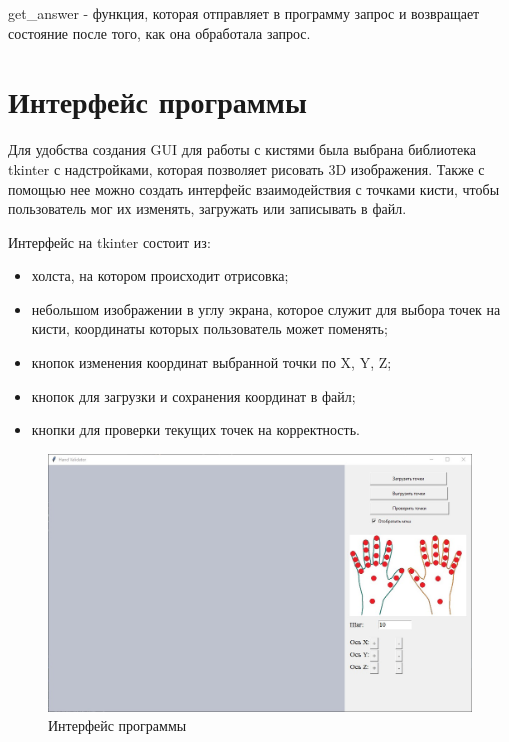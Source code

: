 \hspace{0.6cm} get\_answer - функция, которая отправляет в программу запрос и возвращает состояние после того, как она обработала запрос.

\section{Интерфейс программы}
\hspace{0.6cm} Для удобства создания GUI для работы с кистями была выбрана библиотека tkinter с надстройками, которая позволяет рисовать 3D изображения. Также с помощью нее можно создать интерфейс взаимодействия с точками кисти, чтобы пользователь мог их изменять, загружать или записывать в файл.

\hspace{0.6cm} Интерфейс на tkinter состоит из:
\begin{itemize}
	\item холста, на котором происходит отрисовка;
	\item небольшом изображении в углу экрана, которое служит для выбора точек на кисти, координаты которых пользователь может поменять;
	\item кнопок изменения координат выбранной точки по X, Y, Z;
	\item кнопок для загрузки и сохранения координат в файл;
	\item кнопки для проверки текущих точек на корректность.
\end{itemize}

\begin{figure}[ht!]
	\centering
	\includegraphics[scale=0.5]{example_gui.jpg}
	\caption{Интерфейс программы}
	\label{fig:gui}
\end{figure}

